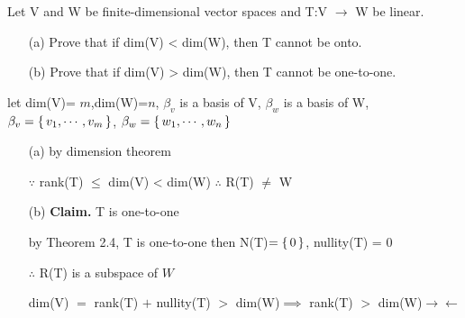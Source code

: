 Let V and W be finite-dimensional vector spaces and T:V $\rightarrow$ W be linear.

\begin{enumerate}
	\item[(a)] Prove that if dim(V) < dim(W), then T cannot be onto.
	\item[(b)] Prove that if dim(V) > dim(W), then T cannot be one-to-one.
\end{enumerate}

\begin{tcolorbox}
\begin{solution}
let dim(V)= $m$,dim(W)=$n$, $\beta_v$ is a basis of V, $\beta_w$ is a basis of W, $\beta_v = \left\{ \,v_1,\cdots,v_m \,\right\}$, $\beta_w = \left\{ \,w_1,\cdots,w_n \,\right\}$

\begin{enumerate}
	\item[(a)] by dimension theorem
	
	$\because$ rank(T) $\leq$ dim(V) < dim(W) $\therefore$ R(T) $\neq$ W
	
	\item[(b)] \textbf{Claim.} T is one-to-one
	
	by Theorem 2.4, T is one-to-one then N(T)$= \left\{ \,0 \,\right\}$, nullity(T) = $0$
	
	$\therefore$ R(T) is a subspace of $W$
	
	dim(V) $=$ rank(T) $+$ nullity(T) $>$ dim(W)$\implies$ rank(T) $>$ dim(W)$\rightarrow\leftarrow$
	
\end{enumerate}

\end{solution}

\end{tcolorbox}
